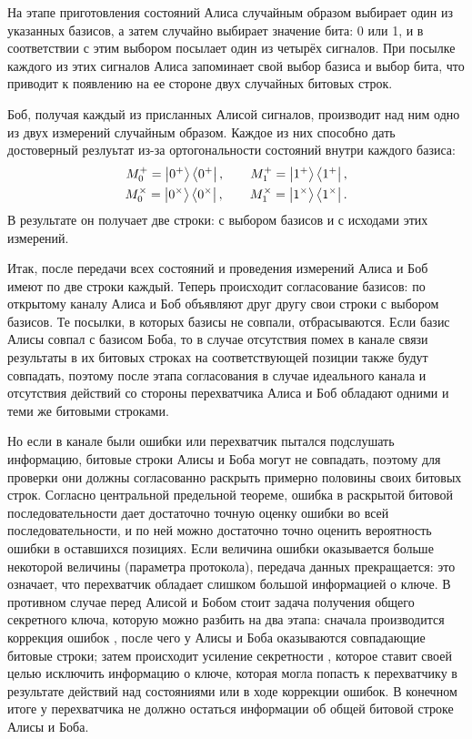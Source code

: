 На этапе приготовления состояний Алиса случайным образом выбирает один из указанных базисов, а затем случайно выбирает значение бита: 0 или 1, и в соответствии с этим выбором посылает один из четырёх сигналов. При посылке каждого из этих сигналов Алиса запоминает свой выбор базиса и выбор бита, что приводит к появлению на ее стороне двух случайных битовых строк.

Боб, получая каждый из присланных Алисой сигналов, производит над ним одно из двух измерений случайным образом. Каждое из них способно дать достоверный резлуьтат из-за ортогональности состояний внутри каждого базиса:
\begin{eqnarray}\label{bb84_bob_measurements}
  M_0^+ = \left| 0^+ \right\rangle\left\langle 0^+ \right|, \qquad M_1^+ = \left| 1^+ \right\rangle\left\langle 1^+ \right|, \nonumber\\
  M_0^\times = \left| 0^\times \right\rangle\left\langle 0^\times \right|, \qquad M_1^\times = \left| 1^\times \right\rangle\left\langle 1^\times \right|.
\end{eqnarray}
В результате он получает две строки: с выбором базисов и с исходами этих измерений.

Итак, после передачи всех состояний и проведения измерений Алиса и Боб имеют по две строки каждый. Теперь происходит согласование базисов: по открытому каналу Алиса и Боб объявляют друг другу свои строки с выбором базисов. Те посылки, в которых базисы не совпали, отбрасываются. Если базис Алисы совпал с базисом Боба, то в случае отсутствия помех в канале связи результаты в их битовых строках на соответствующей позиции также будут совпадать, поэтому после этапа согласования в случае идеального канала и отсутствия действий со стороны перехватчика Алиса и Боб обладают одними и теми же битовыми строками.

Но если в канале были ошибки или перехватчик пытался подслушать информацию, битовые строки Алисы и Боба могут не совпадать, поэтому для проверки они должны согласованно раскрыть примерно половины своих битовых строк. Согласно центральной предельной теореме, ошибка в раскрытой битовой последовательности дает достаточно точную оценку ошибки во всей последовательности, и по ней можно достаточно точно оценить вероятность ошибки в оставшихся позициях. Если величина ошибки оказывается больше некоторой величины (параметра протокола), передача данных прекращается: это означает, что перехватчик обладает слишком большой информацией о ключе. В противном случае перед Алисой и Бобом стоит задача получения общего секретного ключа, которую можно разбить на два этапа: сначала производится коррекция ошибок \cite{information_reconcilation}, после чего у Алисы и Боба оказываются совпадающие битовые строки; затем происходит усиление секретности \cite{privacy_amplification}, которое ставит своей целью исключить информацию о ключе, которая могла попасть к перехватчику в результате действий над состояниями или в ходе коррекции ошибок. В конечном итоге у перехватчика не должно остаться информации об общей битовой строке Алисы и Боба.

